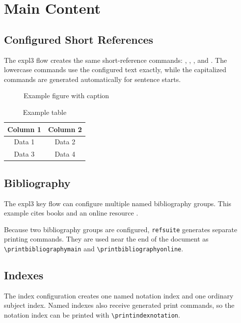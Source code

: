 \documentclass{article}
\begin{document}
\section{Main Content}

\subsection{Configured Short References}

The expl3 flow creates the same short-reference commands: ,
, , and .
The lowercase commands use the configured text exactly, while the capitalized
commands are generated automatically for sentence starts.

\begin{figure}[htbp]
  \centering
  \caption{Example figure with caption}
  \label{fig:sample}
\end{figure}

\begin{table}[htbp]
  \centering
  \begin{tabular}{|c|c|}
    \hline
    Column 1 & Column 2 \\
    \hline
    Data 1 & Data 2 \\
    Data 3 & Data 4 \\
    \hline
  \end{tabular}
  \caption{Example table}
  \label{tab:sample}
\end{table}

\subsection{Bibliography}

The expl3 key flow can configure multiple named bibliography groups. This
example cites books \cite{knuth1984texbook,lamport1994latex} and an online
resource \cite{ctan2024latex}.

Because two bibliography groups are configured, \texttt{refsuite} generates
separate printing commands.  They are used near the end of the document as
\verb|\printbibliographymain| and \verb|\printbibliographyonline|.

\subsection{Indexes}

The index configuration creates one named notation index and one ordinary subject
index.  Named indexes also receive generated print commands, so the notation
index can be printed with \verb|\printindexnotation|.
\end{document}
